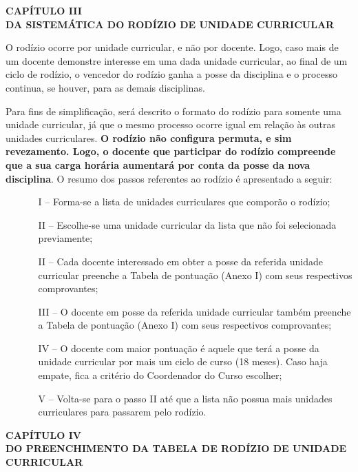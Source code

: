 \documentclass[
	12pt,				%
	openright,			%
	twoside,			%
	a4paper,			%
	chapter=TITLE,		%
	english,			%
	french,				%
	spanish,			%
	brazil,				%
	]{abntex2}
\begin{document}
\begin{anexos}
\begin{center}\bfseries
	CAPÍTULO III
	\\ 
	DA SISTEMÁTICA DO RODÍZIO DE UNIDADE CURRICULAR
	
\end{center}
O rodízio ocorre por unidade curricular, e não por docente. Logo, caso mais de um docente demonstre interesse em uma dada unidade curricular, ao final de um ciclo de rodízio, o vencedor do rodízio ganha a posse da disciplina e o processo continua, se houver, para as demais disciplinas.


Para fins de simplificação, será descrito o formato do rodízio para somente uma unidade curricular, já que o mesmo processo ocorre igual em relação às outras unidades curriculares. \textbf{O rodízio não configura permuta, e sim revezamento. Logo, o docente que participar do rodízio compreende que a sua carga horária aumentará por conta da posse da nova disciplina}. O resumo dos passos referentes ao rodízio é apresentado  a seguir:
\begin{itemize}
\item[] \quad
\begin{itemize}
            \setlength\itemsep{0em}
	\item[I --] Forma-se a lista de unidades curriculares que comporão o rodízio;
	\item[II --] Escolhe-se uma unidade curricular da lista que não foi selecionada previamente;
	\item[II --] Cada docente interessado em obter a posse da referida unidade curricular preenche a Tabela de pontuação (Anexo I) com  seus respectivos comprovantes;
	\item[III --] O docente em posse da referida unidade curricular também preenche a Tabela de pontuação (Anexo I) com  seus respectivos comprovantes;
	\item[IV --]  O docente com maior pontuação é aquele que terá a posse da unidade curricular por mais um ciclo de curso (18 meses). Caso haja empate, fica a critério do Coordenador do Curso escolher;
	\item [V --] Volta-se para o passo II até que a lista não possua mais unidades curriculares para passarem pelo rodízio.
\end{itemize}
\end{itemize}


\begin{center}\bfseries
	CAPÍTULO IV
	\\
	DO PREENCHIMENTO DA TABELA DE RODÍZIO DE UNIDADE CURRICULAR
	

\end{center}
\end{anexos}
\end{document}
